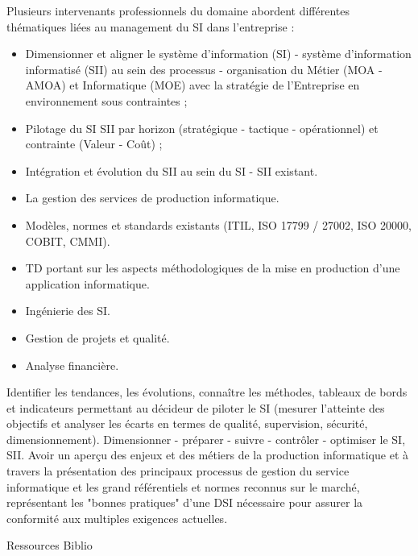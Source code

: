 {
Plusieurs intervenants professionnels du domaine abordent différentes
thématiques liées au management du SI dans l'entreprise :
\begin{itemize}
\item Dimensionner et aligner le système d'information (SI) - système
d'information informatisé (SII) au sein des processus - organisation du
Métier (MOA - AMOA) et Informatique (MOE) avec la stratégie de
l'Entreprise en environnement sous contraintes ;
\item Pilotage du SI SII par horizon (stratégique - tactique - opérationnel) et
contrainte (Valeur - Coût) ;
\item Intégration et évolution du SII au sein du SI - SII existant.
\item La gestion des services de production informatique.
\item Modèles, normes et standards existants (ITIL, ISO 17799 / 27002, ISO
20000, COBIT, CMMI).
\item TD portant sur les aspects méthodologiques de la mise en production
d'une application informatique.
\end{itemize} 
} 
{\begin{itemize} 
\item Ingénierie des SI.
\item Gestion de projets et qualité.
\item Analyse financière.
\end{itemize} 
}
{\begin{itemize} 
  \ObjItem Identifier les tendances, les évolutions, connaître les méthodes, tableaux
de bords et indicateurs permettant au décideur de piloter le SI (mesurer
l'atteinte des objectifs et analyser les écarts en termes de qualité,
supervision, sécurité, dimensionnement).
  \ObjItem Dimensionner - préparer - suivre - contrôler - optimiser le SI, SII.
  \ObjItem Avoir un aperçu des enjeux et des métiers de la production informatique
et à travers la présentation des principaux processus de gestion du service informatique et
les grand référentiels et normes reconnus sur le marché, représentant les
"bonnes pratiques" d'une DSI nécessaire pour assurer la conformité aux
multiples exigences actuelles.
\end{itemize} 
} 
{Ressources} 
{Biblio} 
 
